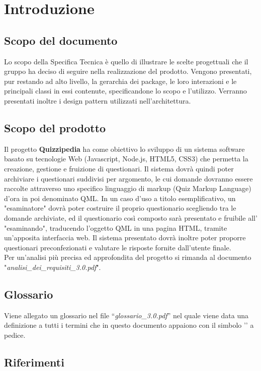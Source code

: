 \documentclass[a4paper,11pt]{article}
\begin{document}
	\newpage
	\section{Introduzione}
	\subsection{Scopo del documento}
	Lo scopo della Specifica Tecnica è quello di illustrare le scelte progettuali che il gruppo ha deciso di seguire nella realizzazione del prodotto. Vengono presentati, pur restando ad alto
livello, la gerarchia dei package, le loro interazioni e le principali classi in essi contenute, specificandone lo scopo e l'utilizzo. Verranno presentati inoltre i design pattern utilizzati nell'architettura.
	
	\subsection{Scopo del prodotto}
	Il progetto \textbf{Quizzipedia} ha come obiettivo lo sviluppo di un sistema software basato su tecnologie Web (Javascript\addglos, Node.js\addglos, HTML5\addglos, CSS3\addglos) che permetta la creazione, gestione e fruizione di questionari. Il sistema dovrà quindi poter archiviare i questionari suddivisi per argomento, le cui domande dovranno essere raccolte attraverso uno specifico linguaggio di markup (Quiz Markup Language) d'ora in poi denominato QML\addglos. In un caso d'uso a titolo esemplificativo, un "esaminatore" dovrà poter costruire il proprio questionario scegliendo tra le domande archiviate, ed il questionario così composto sarà presentato e fruibile all' "esaminando", traducendo l'oggetto QML in una pagina HTML\addglos, tramite un'apposita interfaccia web. Il sistema presentato dovrà inoltre poter proporre questionari preconfezionati e valutare le risposte fornite dall'utente finale.
	\\
	Per un'analisi più precisa ed approfondita del progetto si rimanda al documento\\ "\textit{analisi\_dei\_requisiti\_3.0.pdf}".
	\subsection{Glossario}
	Viene allegato un glossario nel file ``\textit{glossario\_3.0.pdf}'' nel quale viene data una definizione a tutti i termini che in questo documento appaiono con il simbolo '\addglos' a pedice.
	\subsection{Riferimenti}
\end{document}
